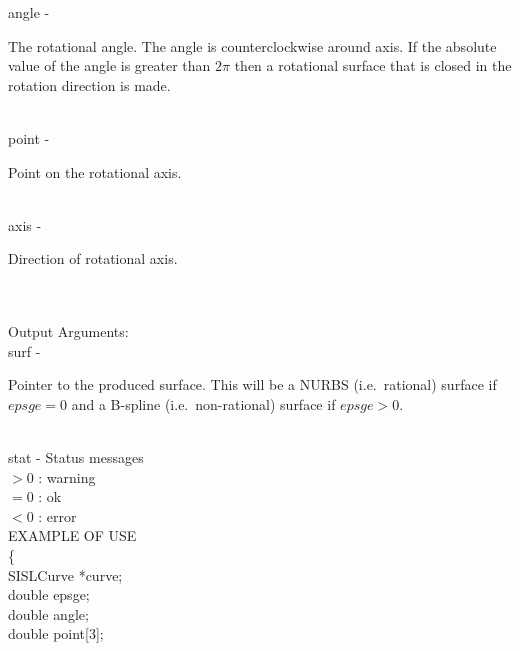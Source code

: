         \>\>    {\fov angle}    \> - \> \begin{minipg2}
                        The rotational angle. The angle is counterclockwise around axis. If the absolute
                        value of the angle is greater than $2\pi$ then a rotational surface that is
                        closed in the rotation direction is made.
                                \end{minipg2}\\[0.8ex]
        \>\>    {\fov point}    \> - \> \begin{minipg2}
                                Point on the rotational axis.
                                \end{minipg2} \\
        \>\>    {\fov axis}     \> - \> \begin{minipg2}
                                Direction of rotational axis.
                                \end{minipg2} \\
\\
        \>Output Arguments:\\
        \>\>    {\fov surf}     \> - \> \begin{minipg2}
                                        Pointer to the produced surface.
                                        This will be a NURBS (i.e.\
                                        rational) surface if $epsge=0$
                                        and a \mbox{B-spline} (i.e.\
                                        non-rational) surface if $epsge>0$.
                                \end{minipg2}\\
        \>\>    {\fov stat}     \> - \> Status messages\\
                \>\>\>\>\>              $>0$    : warning\\
                \>\>\>\>\>              $=0$    : ok\\
                \>\>\>\>\>              $<0$    : error\\
\newpagetabs
EXAMPLE OF USE\\
                \>      \{ \\
                \>\>    SISLCurve       \>      *{\fov curve};\\
                \>\>    double  \>      {\fov epsge};\\
                \>\>    double  \>      {\fov angle};\\
                \>\>    double  \>      {\fov point}[3];\\
